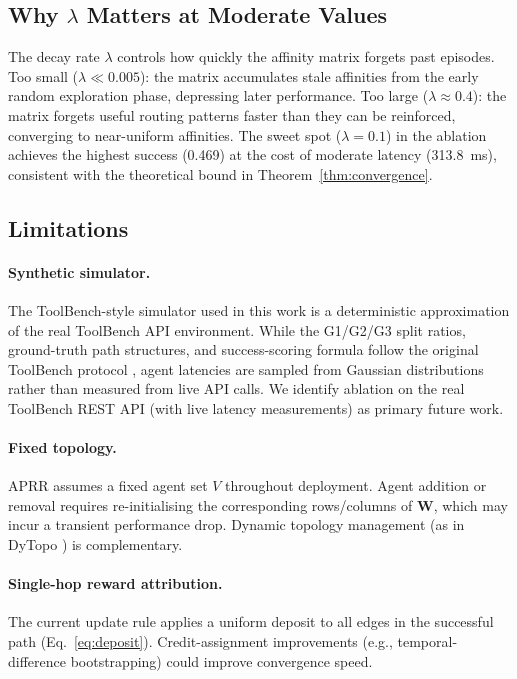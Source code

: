 \documentclass[journal,twocolumn,letterpaper]{IEEEtran}
\newcommand{\APRR}{\textsc{APRR}}
\newcommand{\WW}{\mathbf{W}}
\begin{document}
\subsection{Why $\lambda$ Matters at Moderate Values}

The decay rate $\lambda$ controls how quickly the affinity matrix forgets past
episodes.  Too small ($\lambda\ll0.005$): the matrix accumulates stale
affinities from the early random exploration phase, depressing later
performance.  Too large ($\lambda\approx0.4$): the matrix forgets useful
routing patterns faster than they can be reinforced, converging to near-uniform
affinities.  The sweet spot ($\lambda=0.1$) in the ablation achieves the
highest success (0.469) at the cost of moderate latency (313.8~ms), consistent
with the theoretical bound in Theorem~\ref{thm:convergence}.

\subsection{Limitations}

\paragraph{Synthetic simulator.}
The ToolBench-style simulator used in this work is a deterministic
approximation of the real ToolBench API environment.  While the G1/G2/G3 split
ratios, ground-truth path structures, and success-scoring formula follow the
original ToolBench protocol \cite{qin2024toolllm}, agent latencies are sampled
from Gaussian distributions rather than measured from live API calls.  We
identify ablation on the real ToolBench REST API (with live latency
measurements) as primary future work.

\paragraph{Fixed topology.}
\APRR{} assumes a fixed agent set $V$ throughout deployment.  Agent addition
or removal requires re-initialising the corresponding rows/columns of $\WW$,
which may incur a transient performance drop.  Dynamic topology management
(as in DyTopo \cite{lu2026dytopo}) is complementary.

\paragraph{Single-hop reward attribution.}
The current update rule applies a uniform deposit to all edges in the
successful path (Eq.~\eqref{eq:deposit}).  Credit-assignment improvements
(e.g., temporal-difference bootstrapping) could improve convergence speed.
\end{document}
